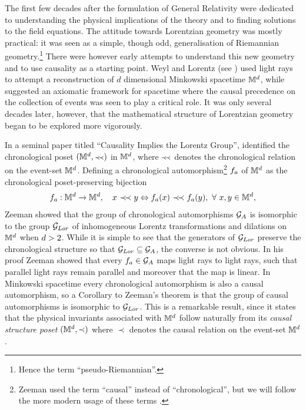 The first few decades after the formulation of General Relativity were dedicated to
understanding the physical implications of the theory
and to finding solutions to the field equations. The attitude  towards Lorentzian geometry was mostly 
practical:  it was seen as a simple, though odd,  generalisation
of Riemannian geometry.\footnote{Hence the term
  ``pseudo-Riemannian''.}  There were however early attempts to understand this new geometry and to use causality as a
starting point. Weyl
and Lorentz  (see \citealt{weyl}) used light rays to attempt a
reconstruction of $d $ dimensional Minkowski spacetime {$\mathbb M^d$}, while 
\cite{robbone,robbtwo} suggested an axiomatic framework for
spacetime where the causal precedence on the collection of events was seen to play a critical role.
It was only several decades later, however,  that the mathematical structure of Lorentzian geometry began to be explored more vigorously. 


In a seminal paper titled ``Causality Implies the Lorentz Group'', \cite{zeeman} identified the {chronological poset}
$(\mink^d,\pprec)$ in $\mathbb M^d$, where  {{$\pprec$}} denotes  the  {chronological relation} on the event-set $\mathbb M^d$. Defining a {chronological automorphism}\footnote{Zeeman used the term ``causal'' instead of
 ``chronological'', but we will follow the more modern usage of these terms \citep{HE,Wald}.} $f_a$ of
$\mathbb M^d$ as the chronological poset-preserving bijection
\begin{equation}
 \fca: \mink^d \rightarrow \mink^d, \quad x \, \,\pprec \, \, y \Leftrightarrow \fca(x) \, \,\pprec \, \,\fca(y), \, \, \forall \, \, x,y
 \in \mink^d, 
 \end{equation} 
Zeeman showed that the group of chronological automorphisms $\mathcal G_{A}$ is
isomorphic to  the group $\mathcal G_{Lor}$ 
of inhomogeneous Lorentz transformations and dilations on
$\mathbb M^d$ when $d >2$.  While it is simple to see that
the generators of $\mathcal G_{Lor}$ preserve the chronological structure so that $\mathcal G_{Lor} \subseteq \mathcal G_{A}$, the
converse is not obvious. In his proof Zeeman showed that every $f_a \in \mathcal G_{A}$ maps light rays to light rays, such that
parallel light rays remain parallel and moreover that the map is  linear.  In Minkowski spacetime every chronological
automorphism is also a causal automorphism, so a Corollary to Zeeman's theorem is that the group of causal
automorphisms is isomorphic to $\mathcal G_{Lor}$. This is a remarkable result, since it states that the physical invariants
associated with $\mathbb M^d$ follow naturally from its \emph{causal structure poset} $(\mathbb M^d,\prec)$ where $\prec$
denotes the causal relation on the event-set $\mathbb M^d$.  


